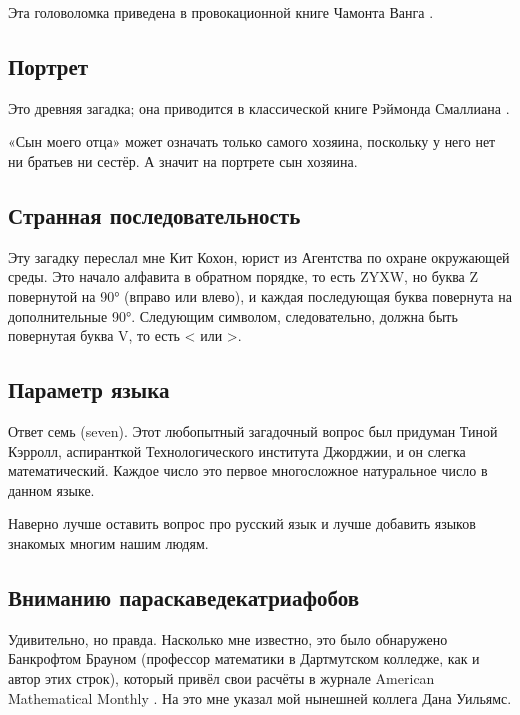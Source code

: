 Эта головоломка приведена в провокационной книге Чамонта Ванга \cite{wang}.

\subsection*{Портрет}

Это древняя загадка;
она приводится в классической книге Рэймонда Смаллиана \cite{smullyan}.

«Сын моего отца» может означать только самого хозяина, поскольку у него нет ни братьев ни сестёр.
А значит на портрете сын хозяина.

\subsection*{Странная последовательность}

Эту загадку переслал мне Кит Кохон, юрист из Агентства по охране окружающей среды.
Это начало алфавита в обратном порядке, то есть ZYXW, но буква Z повернутой на 90° (вправо или влево), и каждая последующая буква повернута на дополнительные 90°.
Следующим символом, следовательно, должна быть повернутая буква V, то есть < или >.

\subsection*{Параметр языка}

Ответ семь (seven).
Этот любопытный загадочный вопрос был придуман Тиной Кэрролл, аспиранткой Технологического института Джорджии,
и он слегка математический. 
Каждое число это первое многосложное натуральное число в данном языке.

\begin{addedbytheeditors}
Наверно лучше оставить вопрос про русский язык и лучше добавить языков знакомых многим нашим людям. 
\end{addedbytheeditors}


\subsection*{Вниманию параскаведекатриафобов}

Удивительно, но правда.
Насколько мне известно, это было обнаружено Банкрофтом Брауном (профессор математики в Дартмутском колледже, как и автор этих строк), который привёл свои расчёты в журнале American Mathematical Monthly \cite{brown}.
На это мне указал мой нынешней коллега Дана Уильямс.

